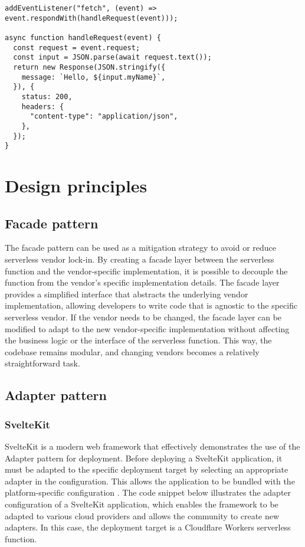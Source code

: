 \begin{lstlisting}[frame=lines, style=ES6, caption={Basic Fastly Compute@Edge handler function}, showstringspaces=false, captionpos=b,]
addEventListener("fetch", (event) => event.respondWith(handleRequest(event)));

async function handleRequest(event) {
  const request = event.request;
  const input = JSON.parse(await request.text());
  return new Response(JSON.stringify({
    message: `Hello, ${input.myName}`,
  }), { 
    status: 200,
    headers: {
      "content-type": "application/json",
    },
  });
}
\end{lstlisting}

\section{Design principles}
\subsection{Facade pattern}
The \gls{facade} pattern can be used as a mitigation strategy to avoid or reduce \gls{serverless} vendor lock-in. By creating a facade layer between the serverless function and the vendor-specific implementation, it is possible to decouple the function from the vendor's specific implementation details.
The facade layer provides a simplified interface that abstracts the underlying vendor implementation, allowing developers to write code that is agnostic to the specific \gls{serverless} vendor. If the vendor needs to be changed, the facade layer can be modified to adapt to the new vendor-specific implementation without affecting the business logic or the interface of the serverless function. This way, the codebase remains modular, and changing vendors becomes a relatively straightforward task.

\subsection{Adapter pattern}

\subsubsection{SvelteKit}

SvelteKit is a modern web framework that effectively demonstrates the use of the Adapter pattern for deployment. Before deploying a SvelteKit application, it must be adapted to the specific deployment target by selecting an appropriate adapter in the configuration. This allows the application to be bundled with the platform-specific configuration \cite{sveltecommunity_2023_adapter}. 
The code snippet below illustrates the adapter configuration of a SvelteKit application, which enables the framework to be adapted to various cloud providers and allows the community to create new adapters. In this case, the deployment target is a Cloudflare Workers \gls{serverless} function.

